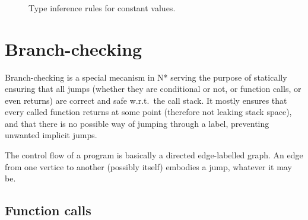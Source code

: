 \begin{figure}[htb]
  \centering

  \begin{prooftree}
  \end{prooftree}
  \\\vspace{\baselineskip}
  \begin{prooftree}
  \end{prooftree}
  \\\vspace{\baselineskip}
  \begin{prooftree}
  \end{prooftree}
  \\\vspace{\baselineskip}
  \begin{prooftree}
  \end{prooftree}

  \caption{Type inference rules for constant values.}
  \label{fig:nstar-common-constvalue-typerules}
\end{figure}

\section{Branch-checking}\label{sec:nstar-common-bs}

Branch-checking is a special mecanism in N* serving the purpose of statically ensuring that all jumps (whether they are conditional or not, or function calls, or even returns) are correct and safe w.r.t.\ the call stack.
It mostly ensures that every called function returns at some point (therefore not leaking stack space), and that there is no possible way of jumping through a label, preventing unwanted implicit jumps.

The control flow of a program is basically a directed edge-labelled graph.
An edge from one vertice to another (possibly itself) embodies a jump, whatever it may be.

\subsection{Function calls}\label{subsec:nstar-common-bs-funcall}

